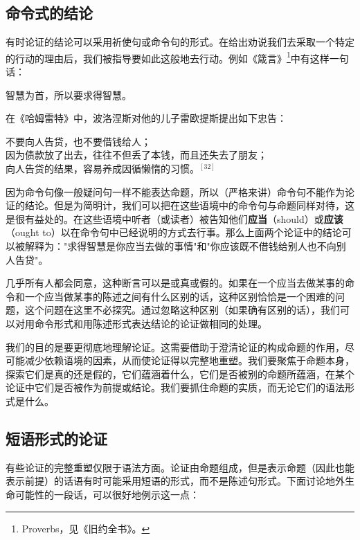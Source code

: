 \subsection{命令式的结论}

有时论证的结论可以采用祈使句或命令句的形式。在给出劝说我们去采取一个特定的行动的理由后，我们被指导要如此这般地去行动。例如《箴言》\footnote{Proverbs，见《旧约全书》。}中有这样一句话：

\begin{displayquote}
智慧为首，所以要求得智慧。
\end{displayquote}

在《哈姆雷特》中，波洛涅斯对他的儿子雷欧提斯提出如下忠告：

\begin{displayquote}
不要向人告贷，也不要借钱给人；\\
因为债款放了出去，往往不但丢了本钱，而且还失去了朋友；\\
向人告贷的结果，容易养成因循懒惰的习惯。${}^{[32]}$
\end{displayquote}

因为命令句像一般疑问句一样不能表达命题，所以（严格来讲）命令句不能作为论证的结论。但是为简明计，我们可以把在这些语境中的命令句与命题同样对待，这是很有益处的。在这些语境中听者（或读者）被告知他们\textbf{应当}（should）或\textbf{应该}（ought to）以在命令句中已经说明的方式去行事。那么上面两个论证中的结论可以被解释为："求得智慧是你应当去做的事情"和"你应该既不借钱给别人也不向别人告贷"。

几乎所有人都会同意，这种断言可以是或真或假的。如果在一个应当去做某事的命令和一个应当做某事的陈述之间有什么区别的话，这种区别恰恰是一个困难的问题，这个问题在这里不必探究。通过忽略这种区别（如果确有区别的话），我们可以对用命令形式和用陈述形式表达结论的论证做相同的处理。

我们的目的是要更彻底地理解论证。这需要借助于澄清论证的构成命题的作用，尽可能减少依赖语境的因素，从而使论证得以完整地重塑。我们要聚焦于命题本身，探索它们是真的还是假的，它们蕴涵着什么，它们是否被别的命题所蕴涵，在某个论证中它们是否被作为前提或结论。我们要抓住命题的实质，而无论它们的语法形式是什么。

\subsection{短语形式的论证}

有些论证的完整重塑仅限于语法方面。论证由命题组成，但是表示命题（因此也能表示前提）的话语有时可能采用短语的形式，而不是陈述句形式。下面讨论地外生命可能性的一段话，可以很好地例示这一点：

